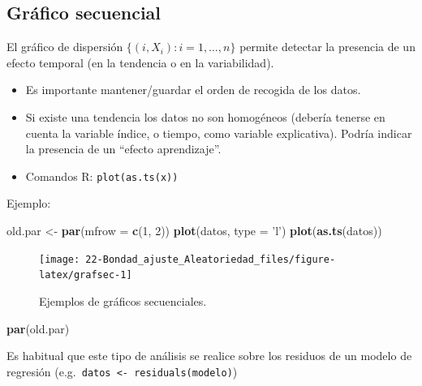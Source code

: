 \documentclass[
]{book}
\newenvironment{Shaded}{\begin{snugshade}}{\end{snugshade}}
\newcommand{\DataTypeTok}[1]{\textcolor[rgb]{0.13,0.29,0.53}{#1}}
\newcommand{\DecValTok}[1]{\textcolor[rgb]{0.00,0.00,0.81}{#1}}
\newcommand{\KeywordTok}[1]{\textcolor[rgb]{0.13,0.29,0.53}{\textbf{#1}}}
\newcommand{\NormalTok}[1]{#1}
\newcommand{\StringTok}[1]{\textcolor[rgb]{0.31,0.60,0.02}{#1}}
\theoremstyle{break}
\theoremstyle{definition}
\theoremstyle{definition}
\theoremstyle{definition}
\theoremstyle{remark}
\begin{document}
\hypertarget{gruxe1fico-secuencial}{%
\subsection{Gráfico secuencial}\label{gruxe1fico-secuencial}}

El gráfico de dispersión \(\{(i,X_{i}) : i = 1, \ldots, n \}\) permite detectar la presencia de un efecto temporal (en la tendencia o en la variabilidad).

\begin{itemize}
\item
  Es importante mantener/guardar el orden de recogida de los datos.
\item
  Si existe una tendencia los datos no son homogéneos (debería tenerse
  en cuenta la variable índice, o tiempo, como variable explicativa).
  Podría indicar la presencia de un ``efecto aprendizaje''.
\item
  Comandos R: \texttt{plot(as.ts(x))}
\end{itemize}

Ejemplo:

\begin{Shaded}
\begin{Highlighting}[]
\NormalTok{old.par <-}\StringTok{ }\KeywordTok{par}\NormalTok{(}\DataTypeTok{mfrow =} \KeywordTok{c}\NormalTok{(}\DecValTok{1}\NormalTok{, }\DecValTok{2}\NormalTok{))}
\KeywordTok{plot}\NormalTok{(datos, }\DataTypeTok{type =} \StringTok{'l'}\NormalTok{)}
\KeywordTok{plot}\NormalTok{(}\KeywordTok{as.ts}\NormalTok{(datos))}
\end{Highlighting}
\end{Shaded}

\begin{figure}[!htb]

{\centering \texttt{[image: 22-Bondad\_ajuste\_Aleatoriedad\_files/figure-latex/grafsec-1]} 

}

\caption{Ejemplos de gráficos secuenciales.}\label{fig:grafsec}
\end{figure}

\begin{Shaded}
\begin{Highlighting}[]
\KeywordTok{par}\NormalTok{(old.par)}
\end{Highlighting}
\end{Shaded}

Es habitual que este tipo de análisis se realice sobre los residuos
de un modelo de regresión (e.g.~\texttt{datos\ \textless{}-\ residuals(modelo)})
\end{document}

